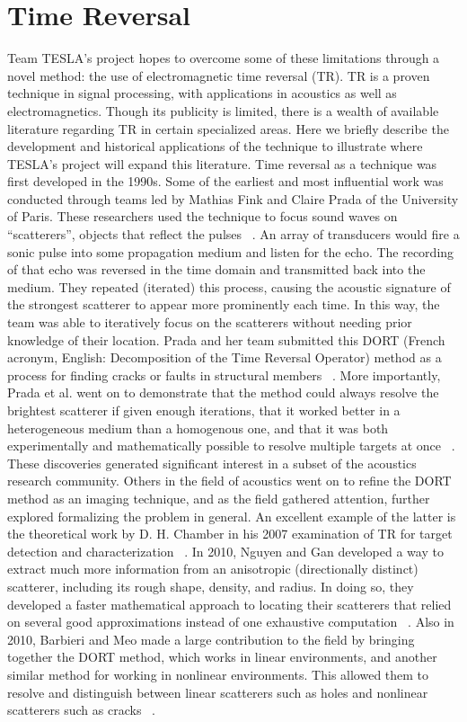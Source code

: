 \section{Time Reversal}
\label{lit-review-tr}

Team TESLA's project hopes to overcome some of these limitations through a novel method: the use of electromagnetic time reversal (TR). TR is a proven technique in signal processing, with applications in acoustics as well as electromagnetics. Though its publicity is limited, there is a wealth of available literature regarding TR in certain specialized areas. Here we briefly describe the development and historical applications of the technique to illustrate where TESLA's project will expand this literature.
Time reversal as a technique was first developed in the 1990s. Some of the earliest and most influential work was conducted through teams led by Mathias Fink and Claire Prada of the University of Paris. These researchers used the technique to focus sound waves on “scatterers”, objects that reflect the pulses ~\cite{prada_iterative_1991}. An array of transducers would fire a sonic pulse into some propagation medium and listen for the echo. The recording of that echo was reversed in the time domain and transmitted back into the medium. They repeated (iterated) this process, causing the acoustic signature of the strongest scatterer to appear more prominently each time. In this way, the team was able to iteratively focus on the scatterers without needing prior knowledge of their location. Prada and her team submitted this DORT (French acronym, English: Decomposition of the Time Reversal Operator) method as a process for finding cracks or faults in structural members ~\cite{prada_iterative_1991}. More importantly, Prada et al. went on to demonstrate that the method could always resolve the brightest scatterer if given enough iterations, that it worked better in a heterogeneous medium than a homogenous one, and that it was both experimentally and mathematically possible to resolve multiple targets at once ~\cite{prada_decomposition_1996}. These discoveries generated significant interest in a subset of the acoustics research community.
Others in the field of acoustics went on to refine the DORT method as an imaging technique, and as the field gathered attention, further explored formalizing the problem in general. An excellent example of the latter is the theoretical work by D. H. Chamber in his 2007 examination of TR for target detection and characterization ~\cite{chambers_target_2007}. In 2010, Nguyen and Gan developed a way to extract much more information from an anisotropic (directionally distinct) scatterer, including its rough shape, density, and radius. In doing so, they developed a faster mathematical approach to locating their scatterers that relied on several good approximations instead of one exhaustive computation ~\cite{nguyen_dort_2010}. Also in 2010, Barbieri and Meo made a large contribution to the field by bringing together the DORT method, which works in linear environments, and another similar method for working in nonlinear environments. This allowed them to resolve and distinguish between linear scatterers such as holes and nonlinear scatterers such as cracks ~\cite{barbieri_time_2010}.
